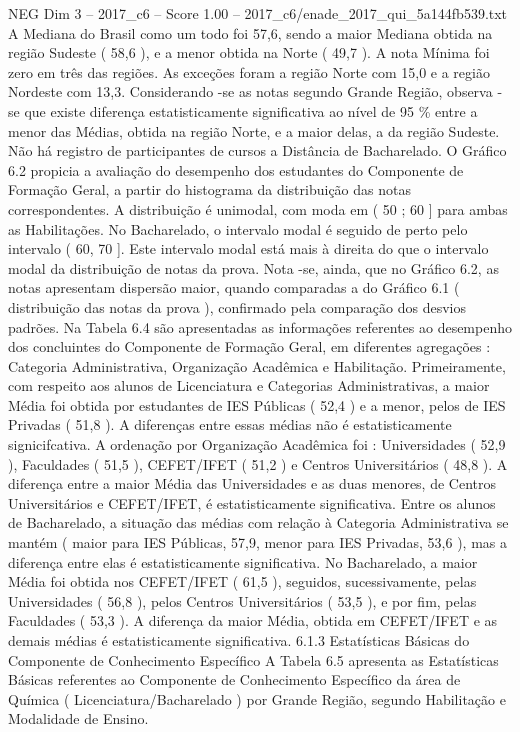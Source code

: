 \begin{textsample}{NEG Dim 3 – 2017\_c6 – Score 1.00 – 2017\_c6/enade\_2017\_qui\_5a144fb539.txt}
A Mediana do Brasil como um todo foi 57,6, sendo a maior Mediana obtida na região Sudeste ( 58,6 ), e a menor obtida na Norte ( 49,7 ).
A nota Mínima foi zero em três das regiões.
As exceções foram a região Norte com 15,0 e a região Nordeste com 13,3.
Considerando -se as notas segundo Grande Região, observa -se que existe diferença estatisticamente significativa ao nível de 95 \% entre a menor das Médias, obtida na região Norte, e a maior delas, a da região Sudeste.
Não há registro de participantes de cursos a Distância de Bacharelado.
O Gráfico 6.2 propicia a avaliação do desempenho dos estudantes do Componente de Formação Geral, a partir do histograma da distribuição das notas correspondentes.
A distribuição é unimodal, com moda em ( 50 ; 60 ] para ambas as Habilitações.
No Bacharelado, o intervalo modal é seguido de perto pelo intervalo ( 60, 70 ].
Este intervalo modal está mais à direita do que o intervalo modal da distribuição de notas da prova.
Nota -se, ainda, que no Gráfico 6.2, as notas apresentam dispersão maior, quando comparadas a do Gráfico 6.1 ( distribuição das notas da prova ), confirmado pela comparação dos desvios padrões.
Na Tabela 6.4 são apresentadas as informações referentes ao desempenho dos concluintes do Componente de Formação Geral, em diferentes agregações : Categoria Administrativa, Organização Acadêmica e Habilitação.
Primeiramente, com respeito aos alunos de Licenciatura e Categorias Administrativas, a maior Média foi obtida por estudantes de IES Públicas ( 52,4 ) e a menor, pelos de IES Privadas ( 51,8 ).
A diferenças entre essas médias não é estatisticamente signicifcativa.
A ordenação por Organização Acadêmica foi : Universidades ( 52,9 ), Faculdades ( 51,5 ), CEFET/IFET ( 51,2 ) e Centros Universitários ( 48,8 ).
A diferença entre a maior Média das Universidades e as duas menores, de Centros Universitários e CEFET/IFET, é estatisticamente significativa.
Entre os alunos de Bacharelado, a situação das médias com relação à Categoria Administrativa se mantém ( maior para IES Públicas, 57,9, menor para IES Privadas, 53,6 ), mas a diferença entre elas é estatisticamente significativa.
No Bacharelado, a maior Média foi obtida nos CEFET/IFET ( 61,5 ), seguidos, sucessivamente, pelas Universidades ( 56,8 ), pelos Centros Universitários ( 53,5 ), e por fim, pelas Faculdades ( 53,3 ).
A diferença da maior Média, obtida em CEFET/IFET e as demais médias é estatisticamente significativa. 6.1.3 Estatísticas Básicas do Componente de Conhecimento Específico A Tabela 6.5 apresenta as Estatísticas Básicas referentes ao Componente de Conhecimento Específico da área de Química ( Licenciatura/Bacharelado ) por Grande Região, segundo Habilitação e Modalidade de Ensino.

\end{textsample}
